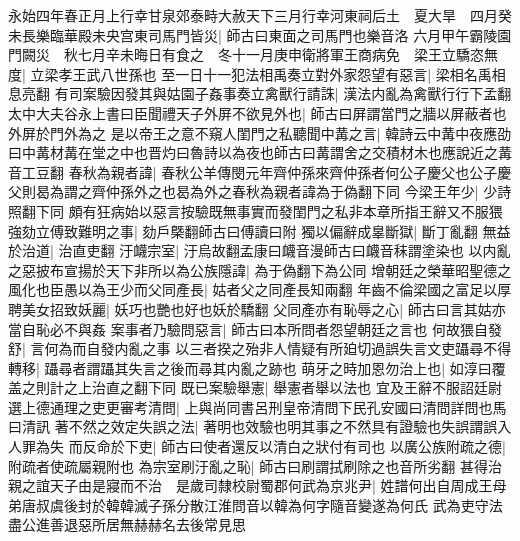 永始四年春正月上行幸甘泉郊泰畤大赦天下三月行幸河東祠后土　夏大旱　四月癸未長樂臨華殿未央宫東司馬門皆災|{
	師古曰東面之司馬門也樂音洛}
六月甲午霸陵園門闕災　秋七月辛未晦日有食之　冬十一月庚申衛將軍王商病免　梁王立驕恣無度|{
	立梁孝王武八世孫也}
至一日十一犯法相禹奏立對外家怨望有惡言|{
	梁相名禹相息亮翻}
有司案驗因發其與姑園子姦事奏立禽獸行請誅|{
	漢法内亂為禽獸行行下孟翻}
太中大夫谷永上書曰臣聞禮天子外屏不欲見外也|{
	師古曰屏謂當門之牆以屏蔽者也外屏於門外為之}
是以帝王之意不窺人閨門之私聽聞中冓之言|{
	韓詩云中冓中夜應劭曰中冓材冓在堂之中也晋灼曰魯詩以為夜也師古曰冓謂舍之交積材木也應說近之冓音工豆翻}
春秋為親者諱|{
	春秋公羊傳閔元年齊仲孫來齊仲孫者何公子慶父也公子慶父則曷為謂之齊仲孫外之也曷為外之春秋為親者諱為于偽翻下同}
今梁王年少|{
	少詩照翻下同}
頗有狂病始以惡言按驗既無事實而發閨門之私非本章所指王辭又不服猥強劾立傅致難明之事|{
	劾戶槩翻師古曰傅讀曰附}
獨以偏辭成辠斷獄|{
	斷丁亂翻}
無益於治道|{
	治直吏翻}
汙衊宗室|{
	汙烏故翻孟康曰衊音漫師古曰衊音秣謂塗染也}
以内亂之惡披布宣揚於天下非所以為公族隱諱|{
	為于偽翻下為公同}
增朝廷之榮華昭聖德之風化也臣愚以為王少而父同產長|{
	姑者父之同產長知兩翻}
年齒不倫梁國之富足以厚聘美女招致妖麗|{
	妖巧也艷也好也妖於驕翻}
父同產亦有恥辱之心|{
	師古曰言其姑亦當自恥必不與姦}
案事者乃驗問惡言|{
	師古曰本所問者怨望朝廷之言也}
何故猥自發舒|{
	言何為而自發内亂之事}
以三者揆之殆非人情疑有所廹切過誤失言文吏躡尋不得轉移|{
	躡尋者謂躡其失言之後而尋其内亂之跡也}
萌牙之時加恩勿治上也|{
	如淳曰覆盖之則計之上治直之翻下同}
既已案驗舉憲|{
	舉憲者舉以法也}
宜及王辭不服詔廷尉選上德通理之吏更審考清問|{
	上與尚同書呂刑皇帝清問下民孔安國曰清問詳問也馬曰清訊}
著不然之效定失誤之法|{
	著明也效驗也明其事之不然具有證驗也失誤謂誤入人罪為失}
而反命於下吏|{
	師古曰使者還反以清白之狀付有司也}
以廣公族附疏之德|{
	附疏者使疏屬親附也}
為宗室刷汙亂之恥|{
	師古曰刷謂拭刷除之也音所劣翻}
甚得治親之誼天子由是寢而不治　是歲司隸校尉蜀郡何武為京兆尹|{
	姓譜何出自周成王母弟唐叔虞後封於韓韓滅子孫分散江淮問音以韓為何字隨音變遂為何氏}
武為吏守法盡公進善退惡所居無赫赫名去後常見思

